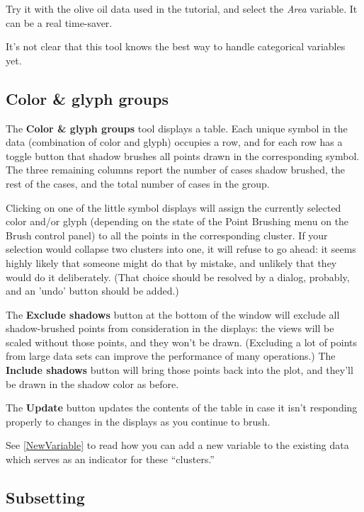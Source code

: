 \documentclass[11pt]{article}
\def\Widget#1{\textbf{#1}}
\begin{document}
Try it with the olive oil data used in the tutorial, and select the {\it
Area} variable.  It can be a real time-saver.

It's not clear that this tool knows the best way to handle categorical
variables yet.

\subsection{Color \& glyph groups}
\label{slbl:ColorAndGlyphGroups}

The \Widget{Color \& glyph groups} tool displays a table.  Each unique
symbol in the data (combination of color and glyph) occupies a row,
and for each row has a toggle button that shadow brushes all points
drawn in the corresponding symbol.  The three remaining columns
report the number of cases shadow brushed, the rest of the cases, and
the total number of cases in the group.

Clicking on one of the little symbol displays will assign the
currently selected color and/or glyph (depending on the state of the
Point Brushing menu on the Brush control panel) to all the points in
the corresponding cluster.  If your selection would collapse two
clusters into one, it will refuse to go ahead:  it seems highly
likely that someone might do that by mistake, and unlikely that they
would do it deliberately.  (That choice should be resolved by a
dialog, probably, and an 'undo' button should be added.)

The \Widget{Exclude shadows} button at the bottom of the window will
exclude all shadow-brushed points from consideration in the
displays:  the views will be scaled without those points, and they
won't be drawn.  (Excluding a lot of points from large data sets can
improve the performance of many operations.)
The \Widget{Include shadows} button will bring those
points back into the plot, and they'll be drawn in the shadow color
as before.

The \Widget{Update} button updates the contents of the table in case it
isn't responding properly to changes in the displays as you continue
to brush.

See \ref{NewVariable} to read how you can add a new variable to the
existing data which serves as an indicator for these ``clusters.''

\subsection{Subsetting}
\end{document}
